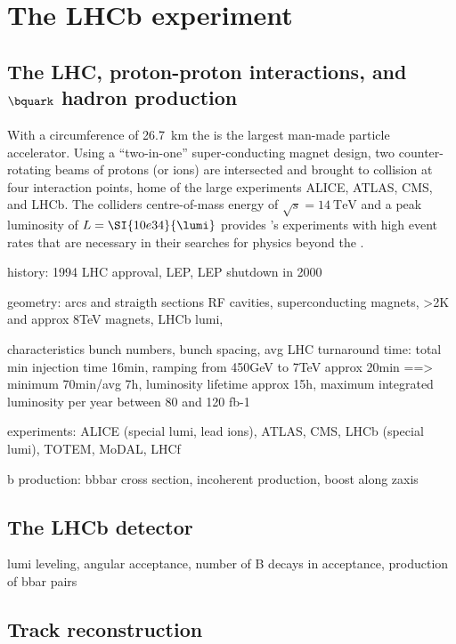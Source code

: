 
\chapter{The LHCb experiment}
\label{ch:lhcb_experiment}

\section{The LHC, proton-proton interactions, and $\bquark$ hadron production}
\label{ch:lhcb_experiment:lhc}

With a circumference of \SI{26.7}{\kilo\metre} the \LHC is the largest man-made
particle accelerator. Using a \enquote{two-in-one} super-conducting magnet
design, two counter-rotating beams of protons (or ions) are intersected and
brought to collision at four interaction points, home of the large \LHC
experiments \acs*{ALICE}, \acs*{ATLAS}, \acs*{CMS}, and \acs*{LHCb}. The
colliders centre-of-mass energy of $\sqrt{s}=\SI{14}{\TeV}$ and a peak
luminosity of $L=\SI{10e34}{\lumi}$ provides \LHC's experiments with high event
rates that are necessary in their searches for physics beyond the \SM.

history:
1994 LHC approval, LEP, LEP shutdown in 2000

geometry:
arcs and straigth sections
RF cavities, superconducting magnets, >2K and approx 8TeV magnets, LHCb lumi,

characteristics
bunch numbers, bunch spacing, avg LHC turnaround time: total min injection time 16min, ramping from 450GeV to 7TeV approx 20min ==> minimum 70min/avg 7h, luminosity lifetime approx 15h, maximum integrated luminosity per year between 80 and 120 fb-1

experiments:
ALICE (special lumi, lead ions), ATLAS, CMS, LHCb (special lumi), TOTEM, MoDAL, LHCf

b production:
bbbar cross section, incoherent production, boost along zaxis


\section{The LHCb detector}
lumi leveling, angular acceptance, number of B decays in acceptance, production of bbar pairs
\section{Track reconstruction}
